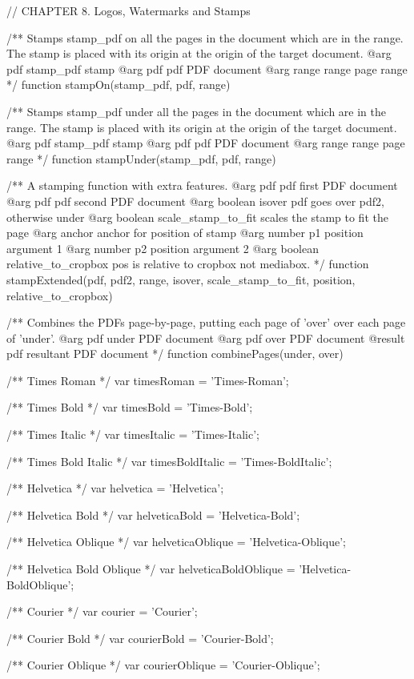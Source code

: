 // CHAPTER 8. Logos, Watermarks and Stamps
   
/** Stamps stamp_pdf on all the pages in the document which are in the
range. The stamp is placed with its origin at the origin of the target
document.
@arg {pdf} stamp_pdf stamp
@arg {pdf} pdf PDF document
@arg {range} range page range */
function stampOn(stamp_pdf, pdf, range) {}

/** Stamps stamp_pdf under all the pages in the document which are in the
range. The stamp is placed with its origin at the origin of the target
document.
@arg {pdf} stamp_pdf stamp
@arg {pdf} pdf PDF document
@arg {range} range page range */
function stampUnder(stamp_pdf, pdf, range) {}

/** A stamping function with extra features. 
@arg {pdf} pdf first PDF document
@arg {pdf} pdf second PDF document
@arg {boolean} isover pdf goes over pdf2, otherwise under
@arg {boolean} scale_stamp_to_fit scales the stamp to fit the page
@arg {anchor} anchor for position of stamp
@arg {number} p1 position argument 1
@arg {number} p2 position argument 2
@arg {boolean} relative_to_cropbox pos is relative to cropbox not mediabox. */
function stampExtended(pdf, pdf2, range, isover, scale_stamp_to_fit, position, relative_to_cropbox) {}

/** Combines the PDFs page-by-page, putting each page of 'over' over each page
of 'under'.
@arg {pdf} under PDF document
@arg {pdf} over PDF document
@result {pdf} resultant PDF document */
function combinePages(under, over) {}

/** Times Roman */
var timesRoman = 'Times-Roman';

/** Times Bold */
var timesBold = 'Times-Bold';

/** Times Italic */
var timesItalic = 'Times-Italic';

/** Times Bold Italic */
var timesBoldItalic = 'Times-BoldItalic';

/** Helvetica */
var helvetica = 'Helvetica';

/** Helvetica Bold */
var helveticaBold = 'Helvetica-Bold';

/** Helvetica Oblique */
var helveticaOblique = 'Helvetica-Oblique';

/** Helvetica Bold Oblique */
var helveticaBoldOblique = 'Helvetica-BoldOblique';

/** Courier */
var courier = 'Courier';

/** Courier Bold */
var courierBold = 'Courier-Bold';

/** Courier Oblique */
var courierOblique = 'Courier-Oblique';


